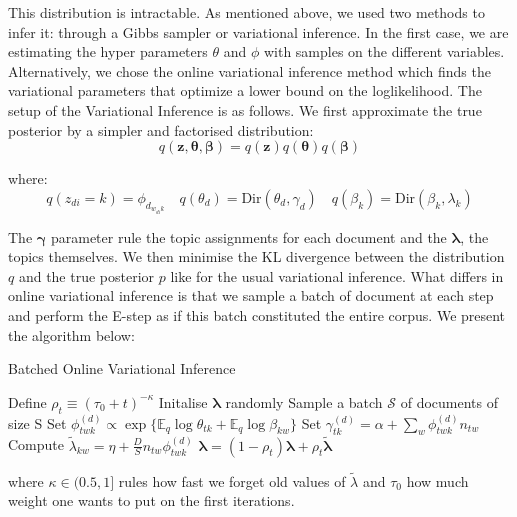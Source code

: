 \documentclass[twoside]{article}
\begin{document}
\begin{multicols}{2}
\noindent This distribution is intractable. As mentioned above, we used two  methods to infer it: through a Gibbs sampler or variational inference. In the first case, we are estimating the hyper parameters $\theta$ and $\phi$ with samples on the different variables. Alternatively, we chose the online variational inference method which finds the variational parameters that optimize a lower bound on the loglikelihood. The setup \cite{OLLD} of the Variational Inference is as follows. We first approximate the true posterior by a simpler and factorised distribution:
$$q(\boldsymbol{z},\boldsymbol{\theta},\boldsymbol{\beta}) = q(\boldsymbol{z})q(\boldsymbol{\theta})q(\boldsymbol{\beta}) $$ 

\noindent where:
$$ q(z_{di} = k) = \phi_{d_{w_{di}k}} \quad q(\theta_d) = \text{Dir}(\theta_d,\gamma_d) \quad q(\beta_k) = \text{Dir}(\beta_k,\lambda_k) $$

\noindent The $\boldsymbol{\gamma}$ parameter rule the topic assignments for each document and the $\boldsymbol{\lambda}$, the topics themselves. We then minimise the KL divergence between the distribution $q$ and the true posterior $p$ like for the usual variational inference. What differs in online variational inference is that we sample a batch of document at each step and perform the E-step as if this batch constituted the entire corpus. We present the algorithm below:

\begin{algorithm}[H]
\caption{Batched Online Variational Inference}\label{euclid}
\begin{algorithmic}[1]
\State Define $\rho_t \equiv (\tau_0 + t)^{-\kappa}$
\State Initalise $\boldsymbol{\lambda}$ randomly
\State Sample a batch $\mathcal{S}$ of documents of size S
\State Set $\phi^{(d)}_{twk} \propto \exp\{\mathbb{E}_q\log\theta_{tk} + \mathbb{E}_q\log\beta_{kw}\}$
\State Set $\gamma^{(d)}_{tk} = \alpha + \sum_{w} \phi^{(d)}_{twk}n_{tw}$
\EndWhile
\State Compute $\tilde{\lambda}_{kw} = \eta +\frac{D}{S}n_{tw}\phi^{(d)}_{twk}$
\EndFor
\State $\boldsymbol{\lambda} = (1-\rho_t)\boldsymbol{\lambda}+\rho_t\boldsymbol{\tilde{\lambda}}$
\EndFor
\end{algorithmic}
\end{algorithm}

\noindent where $\kappa \in (0.5,1]$ rules how fast we forget old values of $\tilde{\lambda}$ and $\tau_{0}$ how much weight one wants to put on the first iterations. 


\end{multicols}
\end{document}
